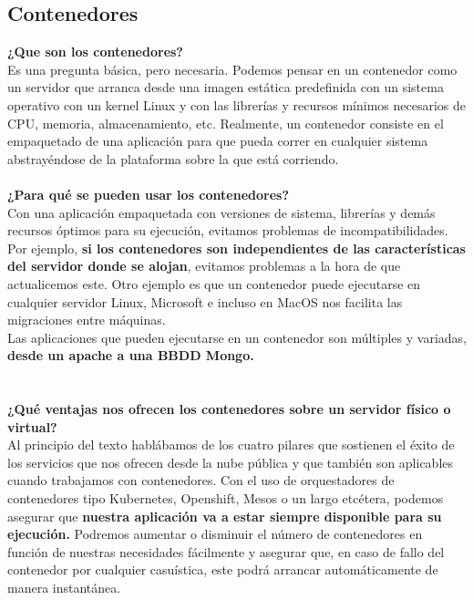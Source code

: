 \documentclass[twoside,twocolumn]{article}
\begin{document}
\begin{flushright}
\begin{itemize}
\subsection{Contenedores}
\textbf{¿Que son los contenedores?}\\
Es una pregunta básica, pero necesaria. Podemos pensar en un contenedor como un servidor que arranca desde una imagen estática predefinida con un sistema operativo con un kernel Linux y con las librerías y recursos mínimos necesarios de CPU, memoria, almacenamiento, etc. Realmente, un contenedor consiste en el empaquetado de una aplicación para que pueda correr en cualquier sistema abstrayéndose de la plataforma sobre la que está corriendo.
\textbf{}\\
\textbf{}\\
\textbf{¿Para qué se pueden usar los contenedores?}\\
Con una aplicación empaquetada con versiones de sistema, librerías y demás recursos óptimos para su ejecución, evitamos problemas de incompatibilidades. Por ejemplo, \textbf{si los contenedores son independientes de las características del servidor donde se alojan}, evitamos problemas a la hora de que actualicemos este.\textbf{}
Otro ejemplo es que un contenedor puede ejecutarse en cualquier servidor Linux, Microsoft e incluso en MacOS nos facilita las migraciones entre máquinas.\textbf{}
\textbf{}\\
Las aplicaciones que pueden ejecutarse en un contenedor son múltiples y variadas, \textbf{desde un apache a una BBDD Mongo.}\\
\textbf{}\\
\textbf{}\\
\textbf{¿Qué ventajas nos ofrecen los contenedores sobre un servidor físico o virtual?}\\
Al principio del texto hablábamos de los cuatro pilares que sostienen el éxito de los servicios que nos ofrecen desde la nube pública y que también son aplicables cuando trabajamos con contenedores. Con el uso de orquestadores de contenedores tipo Kubernetes, Openshift, Mesos o un largo etcétera, podemos asegurar que \textbf{nuestra aplicación va a estar siempre disponible para su ejecución.} Podremos aumentar o disminuir el número de contenedores en función de nuestras necesidades fácilmente y asegurar que, en caso de fallo del contenedor por cualquier casuística, este podrá arrancar automáticamente de manera instantánea.
\textbf{}\\
\textbf{}\\

\end{itemize}
\end{flushright}
\end{document}
